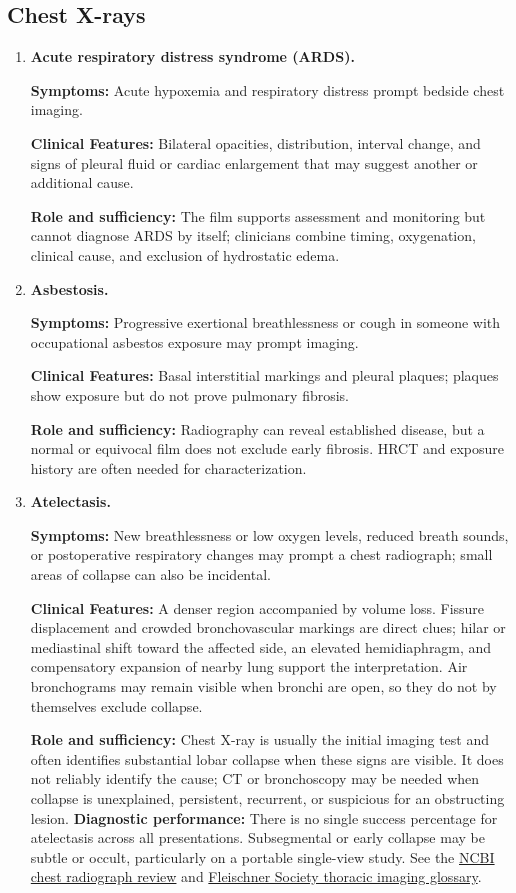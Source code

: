 \subsection{Chest X-rays}
\begin{enumerate}[leftmargin=*,itemsep=0.45em,topsep=0.4em]
\item \textbf{Acute respiratory distress syndrome (ARDS).}\par\noindent\textbf{Symptoms:} Acute hypoxemia and respiratory distress prompt bedside chest imaging.\par\noindent\textbf{Clinical Features:} Bilateral opacities, distribution, interval change, and signs of pleural fluid or cardiac enlargement that may suggest another or additional cause.\par\noindent\textbf{Role and sufficiency:} The film supports assessment and monitoring but cannot diagnose ARDS by itself; clinicians combine timing, oxygenation, clinical cause, and exclusion of hydrostatic edema.
\item \textbf{Asbestosis.}\par\noindent\textbf{Symptoms:} Progressive exertional breathlessness or cough in someone with occupational asbestos exposure may prompt imaging.\par\noindent\textbf{Clinical Features:} Basal interstitial markings and pleural plaques; plaques show exposure but do not prove pulmonary fibrosis.\par\noindent\textbf{Role and sufficiency:} Radiography can reveal established disease, but a normal or equivocal film does not exclude early fibrosis. HRCT and exposure history are often needed for characterization.
\item \textbf{Atelectasis.}\par\noindent\textbf{Symptoms:} New breathlessness or low oxygen levels, reduced breath sounds, or postoperative respiratory changes may prompt a chest radiograph; small areas of collapse can also be incidental.\par\noindent\textbf{Clinical Features:} A denser region accompanied by volume loss. Fissure displacement and crowded bronchovascular markings are direct clues; hilar or mediastinal shift toward the affected side, an elevated hemidiaphragm, and compensatory expansion of nearby lung support the interpretation. Air bronchograms may remain visible when bronchi are open, so they do not by themselves exclude collapse.\par\noindent\textbf{Role and sufficiency:} Chest X-ray is usually the initial imaging test and often identifies substantial lobar collapse when these signs are visible. It does not reliably identify the cause; CT or bronchoscopy may be needed when collapse is unexplained, persistent, recurrent, or suspicious for an obstructing lesion. \textbf{Diagnostic performance:} There is no single success percentage for atelectasis across all presentations. Subsegmental or early collapse may be subtle or occult, particularly on a portable single-view study. See the \href{https://www.ncbi.nlm.nih.gov/books/NBK621651/}{NCBI chest radiograph review} and \href{https://pmc.ncbi.nlm.nih.gov/articles/PMC10902601/}{Fleischner Society thoracic imaging glossary}.

\end{enumerate}
